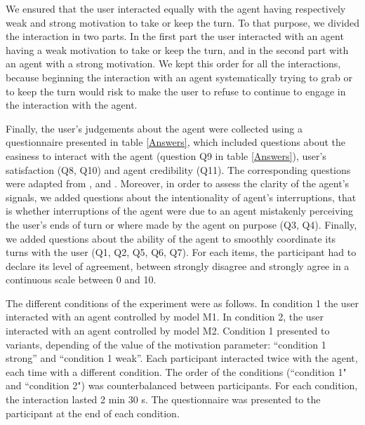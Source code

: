 We ensured that the user interacted equally with the agent having respectively weak and strong motivation to take or keep the turn. To that purpose, we divided the interaction in two parts. In the first part the user interacted with an agent having a weak motivation to take or keep the turn, and in the second part with an agent with a strong motivation.
We kept this order for all the interactions, because beginning the interaction with an agent systematically trying to grab or to keep the turn would risk to make the user to refuse to continue to engage in the interaction with the agent. 

Finally, the user's judgements about the agent were collected using a questionnaire presented in table \ref{Answers}, which included questions about the easiness to interact with the agent (question Q9 in table \ref{Answers}), user's satisfaction (Q8, Q10) and agent credibility (Q11). The corresponding questions were adapted from \cite{skantze_towards_2010}, \cite{bevacqua_effects_2014} and \cite{de_vault_toward_2015}. Moreover, in order to assess the clarity of the agent's signals, we added questions about the intentionality of agent's interruptions, that is whether interruptions of the agent were due to an agent mistakenly perceiving the user's ends of turn or where made by the agent on purpose (Q3, Q4). Finally, we added questions about the ability of the agent to smoothly coordinate its turns with the user (Q1, Q2, Q5, Q6, Q7). For each items, the participant had to declare its level of agreement, between strongly disagree and strongly agree in a continuous scale between 0 and 10. 

The different conditions of the experiment were as follows.
In condition 1 the user interacted with an agent controlled by model M1.
In condition 2, the user interacted with an agent controlled by model M2.
Condition 1 presented to variants, depending of the value of the motivation parameter: ``condition 1 strong'' and ``condition 1 weak''. 
Each participant interacted twice with the agent, each time with a different condition.
The order of the conditions (``condition 1" and ``condition 2") was counterbalanced between participants. For each condition, the interaction lasted 2 min 30 s. The questionnaire was presented to the participant at the end of each condition.


